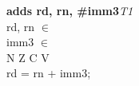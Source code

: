 


\begin{instructionblock}{\imagewidth}%
    \textbf{adds rd, rn, \#imm3}\hfill\textit{T1}\\
    rd, rn $\in$ \baseregisters\\
    imm3 $\in$ \immThree\\
    {N Z C V}\\
    rd = rn + imm3;
\end{instructionblock}

